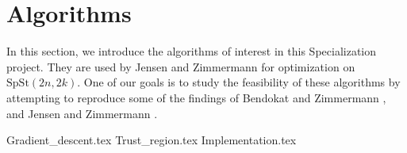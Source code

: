 \section{Algorithms}
In this section, we introduce the algorithms of interest in this Specialization project. They are used by Jensen and Zimmermann for optimization on $\mathrm{SpSt}(2n, 2k)$. One of our goals is to study the feasibility of these algorithms by attempting to reproduce some of the findings of Bendokat and Zimmermann \cite{BendokatZimmermann2021}, and Jensen and Zimmermann \cite{JensenZimmermann2024}. 

{Gradient_descent.tex}
{Trust_region.tex}
{Implementation.tex}